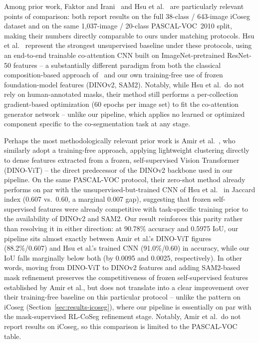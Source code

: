 Among prior work, Faktor and Irani~\cite{faktor2013} and Hsu et al.~\cite{hsu2018} are particularly relevant points of comparison: both report results on the full 38-class / 643-image iCoseg dataset and on the same 1{,}037-image / 20-class PASCAL-VOC~2010 split, making their numbers directly comparable to ours under matching protocols. Hsu et al.~\cite{hsu2018} represent the strongest unsupervised baseline under these protocols, using an end-to-end trainable co-attention CNN built on ImageNet-pretrained ResNet-50 features -- a substantially different paradigm from both the classical composition-based approach of~\cite{faktor2013} and our own training-free use of frozen foundation-model features (DINOv2, SAM2). Notably, while Hsu et al.\ do not rely on human-annotated masks, their method still performs a per-collection gradient-based optimization (60 epochs per image set) to fit the co-attention generator network -- unlike our pipeline, which applies no learned or optimized component specific to the co-segmentation task at any stage.

Perhaps the most methodologically relevant prior work is Amir et al.~\cite{amir2022deepvit}, who similarly adopt a training-free approach, applying lightweight clustering directly to dense features extracted from a frozen, self-supervised Vision Transformer (DINO-ViT) -- the direct predecessor of the DINOv2 backbone used in our pipeline. On the same PASCAL-VOC protocol, their zero-shot method already performs on par with the unsupervised-but-trained CNN of Hsu et al.~\cite{hsu2018} in Jaccard index (0.607 vs.\ 0.60, a marginal 0.007 gap), suggesting that frozen self-supervised features were already competitive with task-specific training prior to the availability of DINOv2 and SAM2. Our result reinforces this parity rather than resolving it in either direction: at 90.78\% accuracy and 0.5975 IoU, our pipeline sits almost exactly between Amir et al.'s DINO-ViT figures (88.2\%/0.607) and Hsu et al.'s trained CNN (91.0\%/0.60) in accuracy, while our IoU falls marginally below both (by 0.0095 and 0.0025, respectively). In other words, moving from DINO-ViT to DINOv2 features and adding SAM2-based mask refinement preserves the competitiveness of frozen self-supervised features established by Amir et al., but does not translate into a clear improvement over their training-free baseline on this particular protocol -- unlike the pattern on iCoseg (Section~\ref{sec:results-icoseg}), where our pipeline is essentially on par with the mask-supervised RL-CoSeg refinement stage. Notably, Amir et al.\ do not report results on iCoseg, so this comparison is limited to the PASCAL-VOC table.

